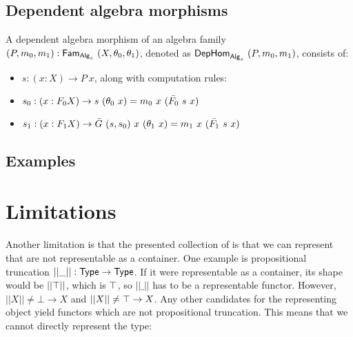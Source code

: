 \documentclass[a4paper,10pt]{report}
\begin{document}

\subsection{Dependent algebra morphisms}

\begin{defn}
  A dependent algebra morphism of an algebra family
  $(P,m_0,m_1) : \mathsf{Fam}_{\mathsf{Alg}_s}\ (X,\theta_0,\theta_1)$, denoted as
  $\mathsf{DepHom}_{\mathsf{Alg}_s}\ (P,m_0,m_1)$, consists of:

  \begin{itemize}
  \item $s : (x : X) \to P\ x$, along with computation rules:
  \item $s_0 : (x : F_0 X) \to s\ (\theta_0\ x) = m_0\ x\ (\bar{F_0}\ s\ x)$
  \item $s_1 : (x : F_1 X) \to \actionsection{G}\ (s,s_0)\ x\ (\theta_1\ x) = m_1\ x\ (\actionsection{F_1}\ s\ x)$
  \end{itemize}
\end{defn}


\subsection{Examples}


\section{Limitations}


Another limitation is that the presented collection of \onehits is
that we can represent \hits that are not representable as a
container. One example is propositional truncation
$|| \_ || : \mathsf{Type} \to \mathsf{Type}$. If it were representable as a container,
its shape would be $|| \top ||$, which is $\top$, so $|| \_ ||$
has to be a representable functor. However, $|| X || \neq \bot \to X$
and $|| X || \neq \top \to X$. Any other candidates for the
representing object yield functors which are not propositional
truncation. This means that we cannot directly represent the type:
\end{document}
